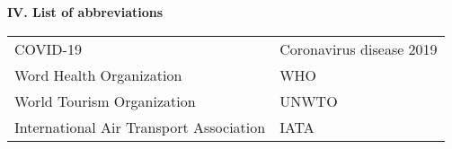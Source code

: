 \thispagestyle{plain}
\textbf{IV. List of abbreviations}

\begin{flushleft}
\begin{table}[!h]
    \centering
    \begin{tabular}{l l}
        COVID-19 & Coronavirus disease 2019 \\ 
        Word Health Organization & WHO \\ 
        World Tourism Organization & UNWTO \\ 
        International Air Transport Association  & IATA \\ 
    \end{tabular}
\end{table}
\end{flushleft}
